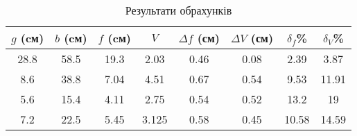 \begin{table}[h] \label{table:fV}
    \centering
    \begin{tabular}{ |c|c|c|c|c|c|c|c| }
        \hline 
        $g$ \textbf{(cм)} & $b$ \textbf{(cм)} & $f$ \textbf{(cм)} & $V$ & $\Delta f$ \textbf{(см)} & $\Delta V$ \textbf{(см)} & $\delta_f$\% & $\delta_V$\% \\
        \hline
        28.8 & 58.5 & 19.3 & 2.03 & 0.46 & 0.08 & 2.39 & 3.87 \\
        \hline
        8.6 & 38.8 & 7.04 & 4.51 & 0.67 & 0.54 & 9.53 & 11.91 \\
        \hline
        5.6 & 15.4 & 4.11 & 2.75 & 0.54 & 0.52 & 13.2 & 19 \\
        \hline
        7.2 & 22.5 & 5.45 & 3.125 & 0.58 & 0.45 & 10.58 & 14.59 \\
        \hline
    \end{tabular}
    \caption{Результати обрахунків}
\end{table}

